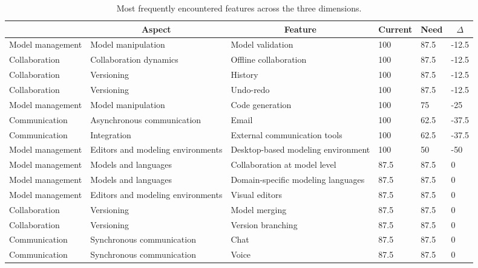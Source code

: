 
  \begin{table*}[]
  \centering
  \notsotiny
  \caption{ Most frequently encountered features across the three dimensions.}
\label{tab:most-frequent}
\begin{tabular}{|l|l|l|l|l|l|}
  \hline
  \rowcolor[HTML]{C0C0C0}
    \multicolumn{1}{|c|}{Dimension} & \multicolumn{1}{c|}{Aspect} & \multicolumn{1}{c|}{Feature} & \multicolumn{1}{c|}{Current} & \multicolumn{1}{c|}{Need} & \multicolumn{1}{c|}{$\Delta$} \\ \hline
    Model management & Model manipulation & Model validation & 100 & 87.5 & -12.5 \\ \hline 
Collaboration & Collaboration dynamics & Offline collaboration & 100 & 87.5 & -12.5 \\ \hline 
Collaboration & Versioning & History & 100 & 87.5 & -12.5 \\ \hline 
Collaboration & Versioning & Undo-redo & 100 & 87.5 & -12.5 \\ \hline 
Model management & Model manipulation & Code generation & 100 & 75 & -25 \\ \hline 
Communication & Asynchronous communication & Email & 100 & 62.5 & -37.5 \\ \hline 
Communication & Integration & External communication tools & 100 & 62.5 & -37.5 \\ \hline 
Model management & Editors and modeling environments & Desktop-based modeling environment & 100 & 50 & -50 \\ \hline 
Model management & Models and languages & Collaboration at model level & 87.5 & 87.5 & 0 \\ \hline 
Model management & Models and languages & Domain-specific modeling languages & 87.5 & 87.5 & 0 \\ \hline 
Model management & Editors and modeling environments & Visual editors & 87.5 & 87.5 & 0 \\ \hline 
Collaboration & Versioning & Model merging & 87.5 & 87.5 & 0 \\ \hline 
Collaboration & Versioning & Version branching & 87.5 & 87.5 & 0 \\ \hline 
Communication & Synchronous communication & Chat & 87.5 & 87.5 & 0 \\ \hline 
Communication & Synchronous communication & Voice & 87.5 & 87.5 & 0 \\ \hline 

\end{tabular}
\end{table*}
